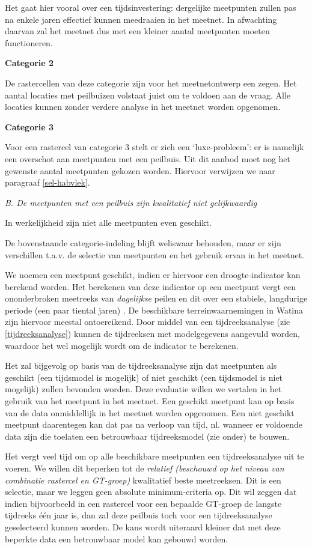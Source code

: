 \documentclass[11pt,]{book}
\begin{document}
Het gaat hier vooral over een tijdsinvestering: dergelijke meetpunten
zullen pas na enkele jaren effectief kunnen meedraaien in het meetnet.
In afwachting daarvan zal het meetnet dus met een kleiner aantal
meetpunten moeten functioneren.

\textbf{Categorie 2}

De rastercellen van deze categorie zijn voor het meetnetontwerp een
zegen. Het aantal locaties met peilbuizen volstaat juist om te voldoen
aan de vraag. Alle locaties kunnen zonder verdere analyse in het meetnet
worden opgenomen.

\textbf{Categorie 3}

Voor een rastercel van categorie 3 stelt er zich een `luxe-probleem': er
is namelijk een overschot aan meetpunten met een peilbuis. Uit dit
aanbod moet nog het gewenste aantal meetpunten gekozen worden. Hiervoor
verwijzen we naar paragraaf \ref{sel-habvlek}.

\emph{B. De meetpunten met een peilbuis zijn kwalitatief niet
gelijkwaardig}

In werkelijkheid zijn niet alle meetpunten even geschikt.

De bovenstaande categorie-indeling blijft weliswaar behouden, maar er
zijn verschillen t.a.v. de selectie van meetpunten en het gebruik ervan
in het meetnet.

We noemen een meetpunt geschikt, indien er hiervoor een
droogte-indicator kan berekend worden. Het berekenen van deze indicator
op een meetpunt vergt een ononderbroken meetreeks van \emph{dagelijkse}
peilen en dit over een stabiele, langdurige periode (een paar tiental
jaren) . De beschikbare terreinwaarnemingen in Watina zijn hiervoor
meestal ontoereikend. Door middel van een tijdreeksanalyse (zie
\ref{tijdreeksanalyse}) kunnen de tijdreeksen met modelgegevens
aangevuld worden, waardoor het wel mogelijk wordt om de indicator te
berekenen.

Het zal bijgevolg op basis van de tijdreeksanalyse zijn dat meetpunten
als geschikt (een tijdsmodel is mogelijk) of niet geschikt (een
tijdsmodel is niet mogelijk) zullen bevonden worden. Deze evaluatie
willen we vertalen in het gebruik van het meetpunt in het meetnet. Een
geschikt meetpunt kan op basis van de data onmiddellijk in het meetnet
worden opgenomen. Een niet geschikt meetpunt daarentegen kan dat pas na
verloop van tijd, nl. wanneer er voldoende data zijn die toelaten een
betrouwbaar tijdreeksmodel (zie onder) te bouwen.

Het vergt veel tijd om op alle beschikbare meetpunten een
tijdreeksanalyse uit te voeren. We willen dit beperken tot de
\emph{relatief (beschouwd op het niveau van combinatie rastercel en
GT-groep)} kwalitatief beste meetreeksen. Dit is een selectie, maar we
leggen geen absolute minimum-criteria op. Dit wil zeggen dat indien
bijvoorbeeld in een rastercel voor een bepaalde GT-groep de langste
tijdreeks één jaar is, dan zal deze peilbuis toch voor een
tijdreeksanalyse geselecteerd kunnen worden. De kans wordt uiteraard
kleiner dat met deze beperkte data een betrouwbaar model kan gebouwd
worden.
\end{document}
